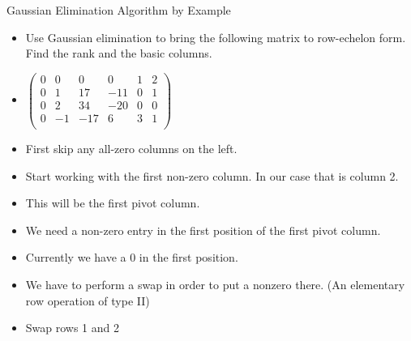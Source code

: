 \documentclass{beamer}
\begin{document}
\begin{frame}{Gaussian Elimination Algorithm by Example}

\begin{itemize}
\item Use Gaussian elimination to bring the following matrix to row-echelon
form. Find the rank and the basic columns.
\item $
\begin{pmatrix}
0 & 0  &   0  &  0   &  1  &  2 \\
0 & 1  &  17  & -11  &  0  &  1  \\
0 & 2  &  34  & -20  &  0  &  0 \\
0 & -1 &  -17   &  6 &  3  &  1 \\
\end{pmatrix}
$
\item First skip any all-zero columns on the left.
\item Start working with the first non-zero column. In our case that is column 2.
\item This will be the first pivot column.
\item We need a non-zero entry in the first position of the first pivot column.
\item Currently we have a 0 in the first position.
\item We have to perform a swap in order to put a nonzero there. (An elementary row operation of type II)
\item Swap rows 1 and 2
\end{itemize}
\end{frame}

\end{document}

